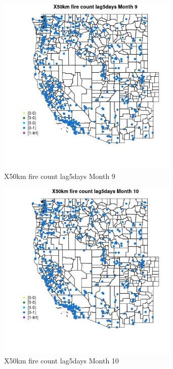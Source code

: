 \begin{figure} 
\centering  
\includegraphics[width=0.77\textwidth]{Code_Outputs/Report_ML_input_PM25_Step4_part_e_de_duplicated_aves_compiled_2019-05-14wNAs_MapObsMo9X50km_fire_count_lag5days.jpg} 
\caption{\label{fig:Report_ML_input_PM25_Step4_part_e_de_duplicated_aves_compiled_2019-05-14wNAsMapObsMo9X50km_fire_count_lag5days}X50km fire count lag5days Month 9} 
\end{figure} 
 

\begin{figure} 
\centering  
\includegraphics[width=0.77\textwidth]{Code_Outputs/Report_ML_input_PM25_Step4_part_e_de_duplicated_aves_compiled_2019-05-14wNAs_MapObsMo10X50km_fire_count_lag5days.jpg} 
\caption{\label{fig:Report_ML_input_PM25_Step4_part_e_de_duplicated_aves_compiled_2019-05-14wNAsMapObsMo10X50km_fire_count_lag5days}X50km fire count lag5days Month 10} 
\end{figure} 
 

